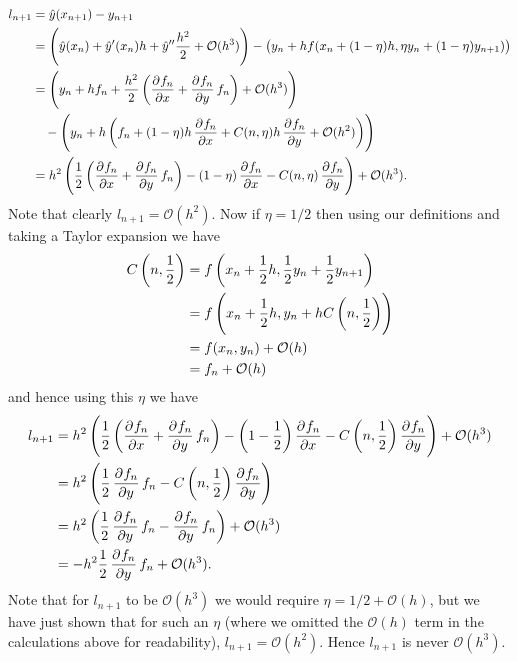 \documentclass{article}
\newcommand{\Oh}{\mathcal{O}}
\begin{document}
\begin{align*}
    l_{n + 1}
        &= \hat{y}(x_{n + 1}) - y_{n + 1} \\
        &= \del{\hat{y}(x_{n}) + \hat{y}^\prime(x_n)h + \hat{y}^{\prime \prime} \frac{h^2}{2} + \Oh(h^3)}
            - \del{y_{n} + h f(x_n + (1 - \eta) h, \eta y_n + (1 - \eta) y_{n + 1})}
        \\
        &= \del{y_n + h f_n + \frac{h^2}{2} \del{\dpd{f_n}{x} + \dpd{f_n}{y} f_n} + \Oh(h^3)}
        \\
        &\quad -
            \del{
                y_n
                +
                h
                \del{
                f_n
                + (1 - \eta) h \dpd{f_n}{x}
                + C(n, \eta) h \dpd{f_n}{y}
                + \Oh(h^2)
                }
            }
        \\
        &= h^2 \del{
            \frac{1}{2}
            \del{\dpd{f_n}{x} + \dpd{f_n}{y} f_n}
            - (1 - \eta) \dpd{f_n}{x}
            - C(n, \eta) \dpd{f_n}{y}
        }
        + \Oh(h^3)
        .
\end{align*}
%
Note that clearly $l_{n + 1} = \Oh(h^2)$.
Now if $\eta = 1/2$ then using our definitions and taking a Taylor expansion we have
%
\begin{align*}
    C\del{n, \frac{1}{2}}
        &= f\del{x_n + \frac{1}{2} h, \frac{1}{2} y_n + \frac{1}{2} y_{n + 1}} \\
        &= f\del{x_n + \frac{1}{2} h, y_n + h C\del{n, \frac{1}{2}}} \\
        &= f(x_n, y_n) + \Oh(h) \\
        &= f_n + \Oh(h)
\end{align*}
%
and hence using this $\eta$ we have
%
\begin{align*}
    l_{n + 1}
        &= h^2 \del{
            \frac{1}{2}
            \del{\dpd{f_n}{x} + \dpd{f_n}{y} f_n}
            - \del{1 - \frac{1}{2}} \dpd{f_n}{x}
            - C\del{n, \frac{1}{2}} \dpd{f_n}{y}
        }
        + \Oh(h^3)
        \\
        &= h^2 \del{
            \frac{1}{2} \dpd{f_n}{y} f_n
            - C\del{n, \frac{1}{2}} \dpd{f_n}{y}
        }
        \\
        &= h^2 \del{
            \frac{1}{2} \dpd{f_n}{y} f_n
            - \dpd{f_n}{y} f_n
        }
        + \Oh(h^3)
        \\
        &= -h^2 \frac{1}{2} \dpd{f_n}{y} f_n
        + \Oh(h^3)
        .
\end{align*}
%
Note that for $l_{n + 1}$ to be $\Oh(h^3)$ we would require $\eta = 1/2 + \Oh(h)$,
but we have just shown that for such an $\eta$ (where we omitted the $\Oh(h)$ term
in the calculations above for readability), $l_{n + 1} = \Oh(h^2)$. Hence $l_{n + 1}$
is never $\Oh(h^3)$.
\end{document}
